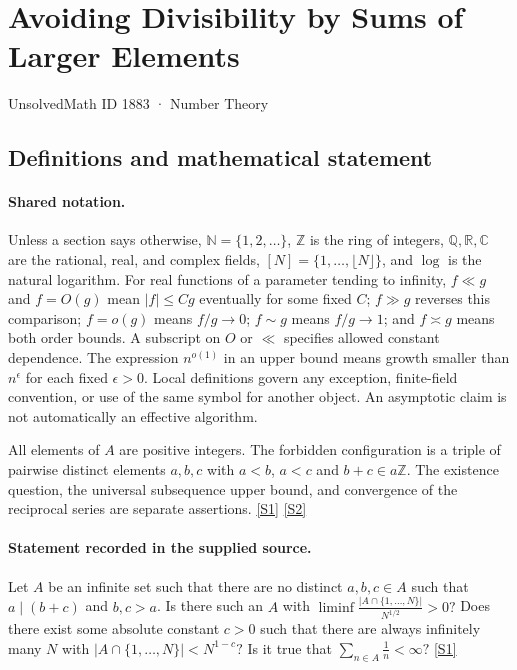 \documentclass[11pt,a4paper]{article}
\newcommand{\N}{\mathbb{N}}
\newcommand{\Z}{\mathbb{Z}}
\newcommand{\Q}{\mathbb{Q}}
\newcommand{\R}{\mathbb{R}}
\newcommand{\C}{\mathbb{C}}
\newcommand{\sref}[2]{\hyperlink{source:#1:#2}{[S#2]}}
\begin{document}

\setcounter{section}{1882}

\section{Avoiding Divisibility by Sums of Larger Elements}\label{1883}

{\small\sffamily UnsolvedMath ID 1883 · Number Theory}

\subsection{Definitions and mathematical statement}

\paragraph{Shared notation.}Unless a section says otherwise, $\N=\{1,2,\ldots\}$,
$\Z$ is the ring of integers, $\Q,\R,\C$ are the rational, real, and complex
fields, $[N]=\{1,\ldots,\lfloor N\rfloor\}$, and $\log$ is the natural
logarithm. For real functions of a parameter tending to infinity,
$f\ll g$ and $f=O(g)$ mean $|f|\leq Cg$ eventually for some fixed $C$;
$f\gg g$ reverses this comparison; $f=o(g)$ means $f/g\to0$;
$f\sim g$ means $f/g\to1$; and $f\asymp g$ means both order bounds.
A subscript on $O$ or $\ll$ specifies allowed constant dependence.
The expression $n^{o(1)}$ in an upper bound means growth smaller than
$n^\epsilon$ for each fixed $\epsilon>0$. Local definitions govern any
exception, finite-field convention, or use of the same symbol for another
object. An asymptotic claim is not automatically an effective algorithm.



All elements of $A$ are positive integers. The forbidden configuration is a triple of pairwise distinct elements $a,b,c$ with $a<b$, $a<c$ and $b+c\in a\Z$. The existence question, the universal subsequence upper bound, and convergence of the reciprocal series are separate assertions. \sref{1883}{1} \sref{1883}{2}

\paragraph{Statement recorded in the supplied source.}
Let $A$ be an infinite set such that there are no distinct $a,b,c\in A$ such that $a\mid (b+c)$ and $b,c>a$. Is there such an $A$ with $ \liminf \frac{\lvert A\cap\{1,\ldots,N\}\rvert}{N^{1/2}}>0? $ Does there exist some absolute constant $c>0$ such that there are always infinitely many $N$ with $ \lvert A\cap\{1,\ldots,N\}\rvert<N^{1-c}? $ Is it true that $ \sum_{n\in A}\frac{1}{n}<\infty? $ \sref{1883}{1}
\end{document}
